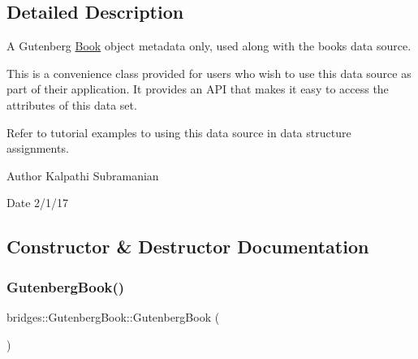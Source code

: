 \subsection{Detailed Description}
A Gutenberg \mbox{\hyperlink{classbridges_1_1_book}{Book}} object metadata only, used along with the books data source. 

This is a convenience class provided for users who wish to use this data source as part of their application. It provides an A\+PI that makes it easy to access the attributes of this data set.

Refer to tutorial examples to using this data source in data structure assignments.

\begin{DoxyAuthor}{Author}
Kalpathi Subramanian 
\end{DoxyAuthor}
\begin{DoxyDate}{Date}
2/1/17 
\end{DoxyDate}


\subsection{Constructor \& Destructor Documentation}
\mbox{\label{classbridges_1_1_gutenberg_book_a289c167dd11eed17cce39a59931f246c}} 
\subsubsection{\texorpdfstring{Gutenberg\+Book()}{GutenbergBook()}\hspace{0.1cm}{\footnotesize\ttfamily [1/2]}}
{\footnotesize\ttfamily bridges\+::\+Gutenberg\+Book\+::\+Gutenberg\+Book (\begin{DoxyParamCaption}{ }\end{DoxyParamCaption})\hspace{0.3cm}{\ttfamily [inline]}}

\mbox{\label{classbridges_1_1_gutenberg_book_a9674a4cf8fa7cd35e640757261376793}} 
